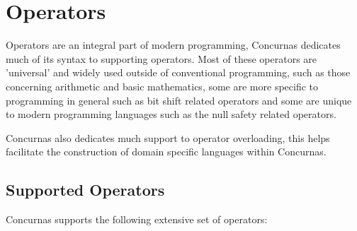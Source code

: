 \documentclass[conc-doc]{subfiles}
\begin{document}
	
	\chapter[Operators]{Operators}
	\label{ch:Operators}


Operators are an integral part of modern programming, Concurnas dedicates much of its syntax to supporting operators. Most of these operators are 'universal' and widely used outside of conventional programming, such as those concerning arithmetic and basic mathematics, some are more specific to programming in general such as bit shift related operators and some are unique to modern programming languages such as the null safety related operators.

Concurnas also dedicates much support to operator overloading, this helps facilitate the construction of domain specific languages within Concurnas.

\section{Supported Operators}
	
Concurnas supports the following extensive set of operators:
\end{document}
